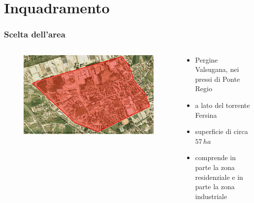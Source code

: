 \documentclass{beamer}
\begin{document}
\section{Inquadramento}
\begin{frame}
 \frametitle{Scelta dell'area}
 \begin{columns}
 \begin{column}{.5\textwidth}
  \begin{figure}
   \centering
   \includegraphics[width=\linewidth]{images/area}
  \end{figure}
  \end{column}

 \begin{column}{.5\textwidth}
  \begin{itemize}[<+->]
   \item Pergine Valsugana, nei pressi di Ponte Regio
   \item a lato del torrente Fersina
   \item superficie di circa $57\,ha$
   \item comprende in parte la zona residenziale e in parte la zona industriale
  \end{itemize}
 \end{column}
 \end{columns}
 
\end{frame}
\end{document}
